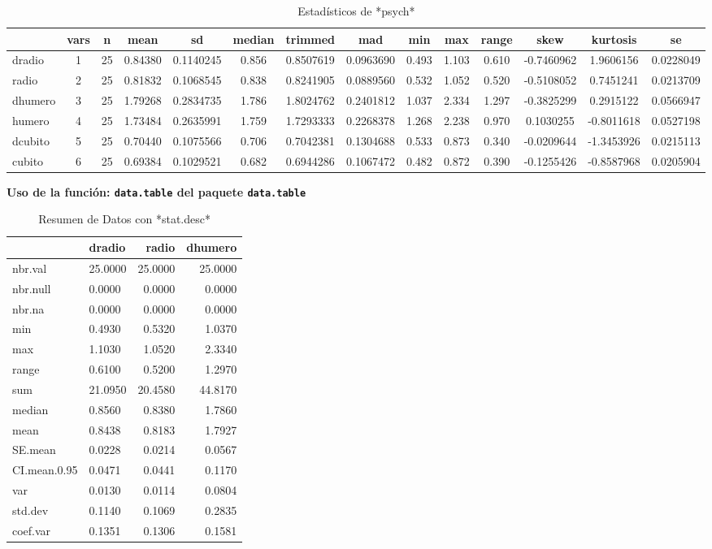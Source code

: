\documentclass[12pt,a4paper,]{book}
\numberwithin{dummy}{section}
\theoremstyle{ocrenumbox}
\theoremstyle{ocrenumbox}
\theoremstyle{ocrenumbox}
\theoremstyle{ocrenumbox}
\theoremstyle{ocrenum}
\begin{document}
\begin{longtable}[t]{lccccccccccccc}
\caption{\label{tab:unnamed-chunk-9}Estadísticos de *psych*}\\
\toprule
 & vars & n & mean & sd & median & trimmed & mad & min & max & range & skew & kurtosis & se\\
\midrule
dradio & 1 & 25 & 0.84380 & 0.1140245 & 0.856 & 0.8507619 & 0.0963690 & 0.493 & 1.103 & 0.610 & -0.7460962 & 1.9606156 & 0.0228049\\
radio & 2 & 25 & 0.81832 & 0.1068545 & 0.838 & 0.8241905 & 0.0889560 & 0.532 & 1.052 & 0.520 & -0.5108052 & 0.7451241 & 0.0213709\\
dhumero & 3 & 25 & 1.79268 & 0.2834735 & 1.786 & 1.8024762 & 0.2401812 & 1.037 & 2.334 & 1.297 & -0.3825299 & 0.2915122 & 0.0566947\\
humero & 4 & 25 & 1.73484 & 0.2635991 & 1.759 & 1.7293333 & 0.2268378 & 1.268 & 2.238 & 0.970 & 0.1030255 & -0.8011618 & 0.0527198\\
dcubito & 5 & 25 & 0.70440 & 0.1075566 & 0.706 & 0.7042381 & 0.1304688 & 0.533 & 0.873 & 0.340 & -0.0209644 & -1.3453926 & 0.0215113\\
\addlinespace
cubito & 6 & 25 & 0.69384 & 0.1029521 & 0.682 & 0.6944286 & 0.1067472 & 0.482 & 0.872 & 0.390 & -0.1255426 & -0.8587968 & 0.0205904\\
\bottomrule
\end{longtable}
\endgroup{}

\textbf{Uso de la función: \texttt{data.table} del paquete
\texttt{data.table}}

\begingroup\fontsize{8}{10}\selectfont

\begin{longtable}[t]{llrr}
\caption{\label{tab:unnamed-chunk-10}Resumen de Datos con *stat.desc*}\\
\toprule
 & dradio & radio & dhumero\\
\midrule
nbr.val & 25.0000 & 25.0000 & 25.0000\\
nbr.null & 0.0000 & 0.0000 & 0.0000\\
nbr.na & 0.0000 & 0.0000 & 0.0000\\
min & 0.4930 & 0.5320 & 1.0370\\
max & 1.1030 & 1.0520 & 2.3340\\
\addlinespace
range & 0.6100 & 0.5200 & 1.2970\\
sum & 21.0950 & 20.4580 & 44.8170\\
median & 0.8560 & 0.8380 & 1.7860\\
mean & 0.8438 & 0.8183 & 1.7927\\
SE.mean & 0.0228 & 0.0214 & 0.0567\\
\addlinespace
CI.mean.0.95 & 0.0471 & 0.0441 & 0.1170\\
var & 0.0130 & 0.0114 & 0.0804\\
std.dev & 0.1140 & 0.1069 & 0.2835\\
coef.var & 0.1351 & 0.1306 & 0.1581\\
\bottomrule
\end{longtable}
\endgroup{}
\end{document}
